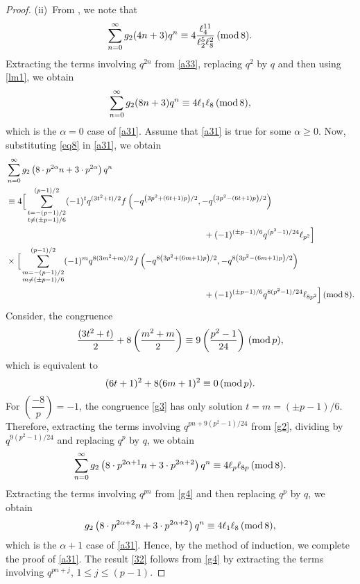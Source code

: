 \documentclass[12pt]{article}
\renewcommand{\(}{\left\(}
\renewcommand{\)}{\right\)}
\renewcommand{\[}{\left[}
\renewcommand{\]}{\right]}
\renewcommand{\pmod}[1]{\,(\textup{mod}\,#1)}
\numberwithin{equation}{section}
\theoremstyle{plain}
\begin{document}
\begin{proof}
 (ii)~From \cite[p. 10 Theorem 4]{GM1}, we note that
 \begin{equation}\label{a33}
  \sum_{n=0}^{\infty}g_2(4n+3)q^n \equiv 4\dfrac{\ell_4^{11}}{\ell_2^5\ell_8^2}\pmod{8}.
 \end{equation}Extracting the terms involving $q^{2n}$ from \eqref{a33}, replacing $q^2$ by $q$ and then using \eqref{lm1}, we obtain
 $$\sum_{n=0}^{\infty}g_2(8n+3)q^n \equiv4\ell_1\ell_8\pmod{8},$$which is the $\alpha=0$ case of \eqref{a31}. Assume that \eqref{a31} is true for some $\alpha\geq0$. Now, substituting \eqref{eq8} in \eqref{a31}, we obtain
 \begin{align}\label{g2}
 &\sum_{n=0}^{\infty} g_2\left(8\cdot p^{2\alpha}n+3\cdot p^{2\alpha}\right)q^n\notag\\ &\equiv4\Big[\sum_{\substack{t={-(p-1)/2} \\ t \ne {(\pm p-1)/6}}}^{(p-1)/2} (-1)^{t} q^{(3t^{2}+t)/2} f\left(-q^{\left(3p^{2}+(6t+1)p\right)/2}, -q^{\left(3p^{2}-(6t+1)p\right)/2}\right)\notag\\
 & \hspace{8cm}+ (-1)^{(\pm p-1)/6} q^{(p^{2}-1)/24} \ell_{p^2}\Big]\notag\\ &\times\Big[\sum_{\substack{m={-(p-1)/2} \\ m \ne {(\pm p-1)/6}}}^{(p-1)/2} (-1)^{m} q^{8(3m^{2}+m)/2} f\left(-q^{8\left(3p^{2}+(6m+1)p\right)/2}, -q^{8\left(3p^{2}-(6m+1)p\right)/2}\right)\notag\\
 &\hspace{8cm} + (-1)^{(\pm p-1)/6} q^{8(p^{2}-1)/24} \ell_{8p^2}\Big]\pmod{8}.
 \end{align}Consider, the congruence
 \begin{equation*}
 \dfrac{(3t^2+t)}{2}+8\left(\dfrac{m^2+m}{2}\right)\equiv 9\left(\dfrac{p^2-1}{24}\right)\pmod{p},
 \end{equation*}which is equivalent to \begin{equation}\label{g3}
 (6t+1)^2+8(6m+1)^2\equiv0\pmod{p}.
 \end{equation}For $\left(\dfrac{-8}{p}\right)=-1$, the congruence \eqref{g3} has only solution $t=m=(\pm p-1)/6$. Therefore, extracting the terms involving $q^{pn+9(p^{2}-1)/24}$ from \eqref{g2}, dividing by $q^{9(p^{2}-1)/24}$ and replacing $q^p$ by $q$, we obtain
 \begin{equation}\label{g4}
 \sum_{n=0}^{\infty} g_2\left(8\cdot p^{2\alpha+1}n+3\cdot p^{2\alpha+2}\right)q^n\equiv 4\ell_p\ell_{8p}\pmod{8}.
 \end{equation}Extracting the terms involving $q^{pn}$ from \eqref{g4} and then replacing $q^p$ by $q$, we obtain
 $$g_2\left(8\cdot p^{2\alpha+2}n+3\cdot p^{2\alpha+2}\right)q^n\equiv 4\ell_1\ell_8\pmod{8},$$ which is the $\alpha+1$ case of \eqref{a31}. Hence, by the method of induction, we complete the proof of \eqref{a31}. The result \eqref{32} follows from \eqref{g4} by extracting the terms involving $q^{pn+j}$, $1\leq j\leq(p-1)$.
\end{proof}
\end{document}
